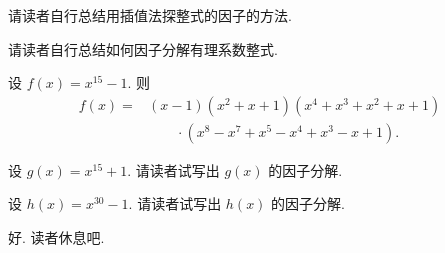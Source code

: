 请读者自行总结用插值法探整式的因子的方法.

请读者自行总结如何因子分解有理系数整式.

\begin{proposition}
    设 $f(x) = x^{15} - 1$. 则
    \begin{align*}
        f(x)
        = {} & (x-1) (x^2+x+1) (x^4+x^3+x^2+x+1)       \\
             & \qquad \cdot (x^8-x^7+x^5-x^4+x^3-x+1).
    \end{align*}
\end{proposition}

设 $g(x) = x^{15} + 1$. 请读者试写出 $g(x)$ 的因子分解.

设 $h(x) = x^{30} - 1$. 请读者试写出 $h(x)$ 的因子分解.

好. 读者休息吧.
